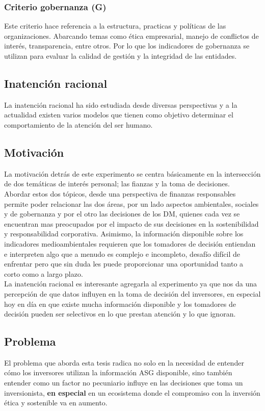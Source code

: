 \documentclass[11pt,letterpaper]{article}
\begin{document}
 \subsubsection{Criterio gobernanza (G)}
Este criterio hace referencia a la estructura, practicas y políticas de las organizaciones. Abarcando temas como ética empresarial, manejo de conflictos de interés, transparencia, entre otros. Por lo que los indicadores de gobernanza se utilizan para evaluar la calidad de gestión y la integridad de las entidades.


\subsection{Inatención racional}

La inatención racional ha sido estudiada desde diversas perspectivas y a la actualidad existen varios modelos que tienen como objetivo determinar el comportamiento de la atención del ser humano.


\subsection{Motivación}
La motivación detrás de este experimento se centra básicamente en la intersección de dos temáticas de interés personal; las fianzas y la toma de decisiones.\\
Abordar estos dos tópicos, desde una perspectiva de finanzas responsables permite poder relacionar las dos áreas, por un lado aspectos ambientales, sociales y de gobernanza y por el otro las decisiones de los DM, quienes cada vez se encuentran mas preocupados por el impacto de sus decisiones en la sostenibilidad y responsabilidad corporativa.
Asimismo, la información disponible sobre los indicadores medioambientales requieren que los tomadores de decisión entiendan e interpreten algo que a menudo es complejo e incompleto, desafío difícil de enfrentar pero que sin duda les puede proporcionar una oportunidad tanto a corto como a largo plazo.\\
La inatención racional es interesante agregarla al experimento ya que nos da una percepción de que datos influyen en la toma de decisión del inversores, en especial hoy en día en que existe mucha información disponible y los tomadores de decisión pueden ser selectivos en lo que prestan atención y lo que ignoran. 

\subsection{Problema}
El problema que aborda esta tesis radica no solo en la necesidad de entender cómo los inversores utilizan la información ASG disponible, sino también entender como un factor no pecuniario influye en las decisiones que toma un inversionista, \textbf{en especial} en un ecosistema donde el compromiso con la inversión ética y sostenible va en aumento. 
\end{document}
